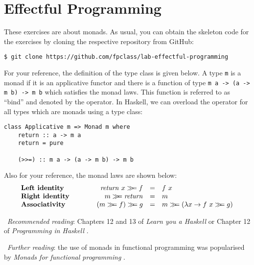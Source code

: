\section{Effectful Programming}

These exercises are about monads. As usual, you can obtain the skeleton code for the exercises by cloning the respective repository from GitHub:
\begin{verbatim}
$ git clone https://github.com/fpclass/lab-effectful-programming
\end{verbatim}
For your reference, the definition of the  type class is given below. A type \texttt{\small m} is a monad if it is an applicative functor and there is a function of type \texttt{\small m~a -> (a -> m~b) -> m~b} which satisfies the monad laws. This function is referred to as ``bind'' and denoted by the  \haskellIn{(>>=)} operator. In Haskell, we can overload the \haskellIn{(>>=)} operator for all types which are monads using a type class:
\begin{verbatim}
class Applicative m => Monad m where 
    return :: a -> m a 
    return = pure 
    
    (>>=) :: m a -> (a -> m b) -> m b
\end{verbatim}
Also for your reference, the monad laws are shown below:
\begin{displaymath}
\begin{array}{lcrcl}
\textbf{Left identity} &\qquad & \mathit{return}~x \bind f & = & f~x \\
\textbf{Right identity} &\qquad & m \bind \mathit{return} & = & m \\
\textbf{Associativity} & \qquad & (m \bind f) \bind g & = & m \bind (\lambda x \to f~x \bind g)
\end{array}
\end{displaymath}

\makebox[0.5cm]{\faBook}~\emph{Recommended reading}: Chapters 12 and 13 of \emph{Learn you a Haskell} \citep{lipovaca2011learn} or Chapter 12 of \emph{Programming in Haskell} \citep{hutton2016programming}.

\makebox[0.5cm]{\faBook}~\emph{Further reading}: the use of monads in functional programming was popularised by \emph{Monads for functional programming} \citep{wadler1995monads}.

\taskLine 

